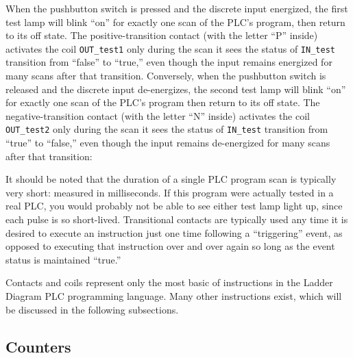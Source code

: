When the pushbutton switch is pressed and the discrete input energized, the first test lamp will blink ``on'' for exactly one scan of the PLC's program, then return to its off state.  The positive-transition contact (with the letter ``P'' inside) activates the coil \texttt{OUT\_test1} only during the scan it sees the status of \texttt{IN\_test} transition from ``false'' to ``true,'' even though the input remains energized for many scans after that transition.  Conversely, when the pushbutton switch is released and the discrete input de-energizes, the second test lamp will blink ``on'' for exactly one scan of the PLC's program then return to its off state.  The negative-transition contact (with the letter ``N'' inside) activates the coil \texttt{OUT\_test2} only during the scan it sees the status of \texttt{IN\_test} transition from ``true'' to ``false,'' even though the input remains de-energized for many scans after that transition:

It should be noted that the duration of a single PLC program scan is typically very short: measured in milliseconds.  If this program were actually tested in a real PLC, you would probably not be able to see either test lamp light up, since each pulse is so short-lived.  Transitional contacts are typically used any time it is desired to execute an instruction just one time following a ``triggering'' event, as opposed to executing that instruction over and over again so long as the event status is maintained ``true.''  



\vskip 10pt

Contacts and coils represent only the most basic of instructions in the Ladder Diagram PLC programming language.  Many other instructions exist, which will be discussed in the following subsections.









\filbreak
\subsection{Counters}

